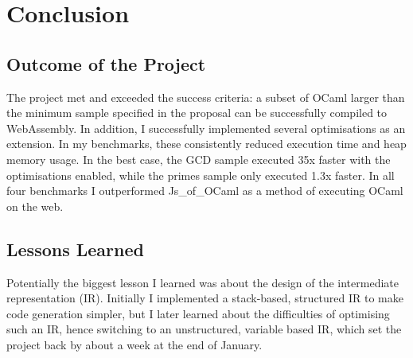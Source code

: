 \chapter{Conclusion}


\section{Outcome of the Project}
The project met and exceeded the success criteria: a subset of OCaml larger than the minimum sample specified in the proposal can be successfully compiled to WebAssembly. In addition, I successfully implemented several optimisations as an extension. In my benchmarks, these consistently reduced execution time and heap memory usage. In the best case, the GCD sample executed 35x faster with the optimisations enabled, while the primes sample only executed 1.3x faster. In all four benchmarks I outperformed Js\_of\_OCaml as a method of executing OCaml on the web.

\section{Lessons Learned}
Potentially the biggest lesson I learned was about the design of the intermediate representation (IR). Initially I implemented a stack-based, structured IR to make code generation simpler, but I later learned about the difficulties of optimising such an IR, hence switching to an unstructured, variable based IR, which set the project back by about a week at the end of January.

